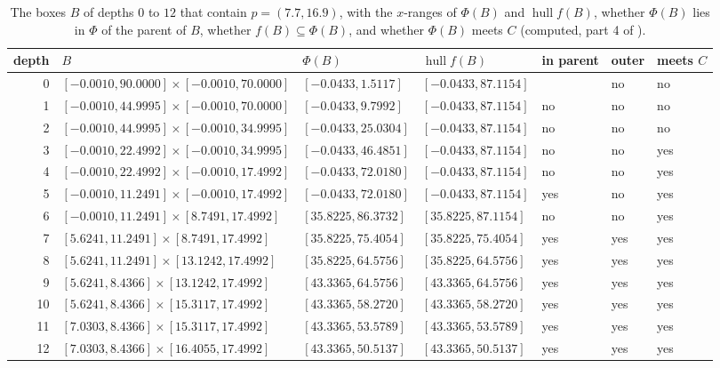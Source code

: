\documentclass[11pt]{article}
\theoremstyle{plain}
\theoremstyle{definition}
\theoremstyle{remark}
\DeclareMathOperator{\hull}{hull}
\begin{document}
\begin{table}[tbp]
\centering
\caption{The boxes $B$ of depths $0$ to $12$ that contain $p=(7.7,16.9)$, with the $x$-ranges of $\Phi(B)$ and $\hull f(B)$, whether $\Phi(B)$ lies in $\Phi$ of the parent of $B$, whether $f(B)\subseteq\Phi(B)$, and whether $\Phi(B)$ meets $C$ (computed, part 4 of ).}\label{tab:chain}
\footnotesize
\setlength{\tabcolsep}{4.5pt}
\begin{tabular}{rllllll}
\toprule
depth & $B$ & $\Phi(B)$ & $\hull f(B)$ & in parent & outer & meets $C$ \\
\midrule
0 & $[-0.0010,90.0000]\times[-0.0010,70.0000]$ & $[-0.0433,1.5117]$ & $[-0.0433,87.1154]$ & & no & no \\
1 & $[-0.0010,44.9995]\times[-0.0010,70.0000]$ & $[-0.0433,9.7992]$ & $[-0.0433,87.1154]$ & no & no & no \\
2 & $[-0.0010,44.9995]\times[-0.0010,34.9995]$ & $[-0.0433,25.0304]$ & $[-0.0433,87.1154]$ & no & no & no \\
3 & $[-0.0010,22.4992]\times[-0.0010,34.9995]$ & $[-0.0433,46.4851]$ & $[-0.0433,87.1154]$ & no & no & yes \\
4 & $[-0.0010,22.4992]\times[-0.0010,17.4992]$ & $[-0.0433,72.0180]$ & $[-0.0433,87.1154]$ & no & no & yes \\
5 & $[-0.0010,11.2491]\times[-0.0010,17.4992]$ & $[-0.0433,72.0180]$ & $[-0.0433,87.1154]$ & yes & no & yes \\
6 & $[-0.0010,11.2491]\times[8.7491,17.4992]$ & $[35.8225,86.3732]$ & $[35.8225,87.1154]$ & no & no & yes \\
7 & $[5.6241,11.2491]\times[8.7491,17.4992]$ & $[35.8225,75.4054]$ & $[35.8225,75.4054]$ & yes & yes & yes \\
8 & $[5.6241,11.2491]\times[13.1242,17.4992]$ & $[35.8225,64.5756]$ & $[35.8225,64.5756]$ & yes & yes & yes \\
9 & $[5.6241,8.4366]\times[13.1242,17.4992]$ & $[43.3365,64.5756]$ & $[43.3365,64.5756]$ & yes & yes & yes \\
10 & $[5.6241,8.4366]\times[15.3117,17.4992]$ & $[43.3365,58.2720]$ & $[43.3365,58.2720]$ & yes & yes & yes \\
11 & $[7.0303,8.4366]\times[15.3117,17.4992]$ & $[43.3365,53.5789]$ & $[43.3365,53.5789]$ & yes & yes & yes \\
12 & $[7.0303,8.4366]\times[16.4055,17.4992]$ & $[43.3365,50.5137]$ & $[43.3365,50.5137]$ & yes & yes & yes \\
\bottomrule
\end{tabular}
\end{table}
\end{document}
